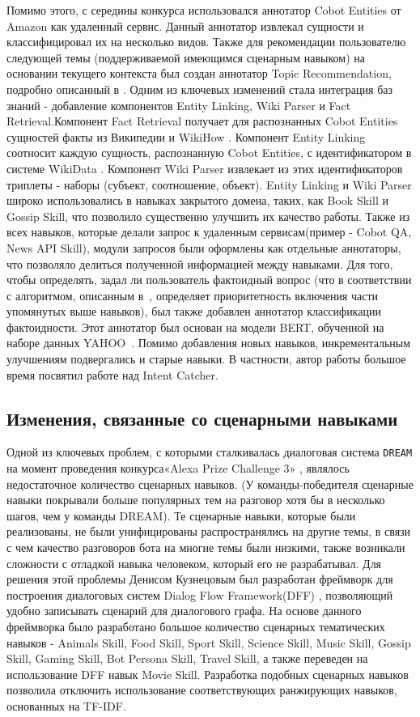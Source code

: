 Помимо этого, с середины конкурса использовался аннотатор Cobot Entities от Amazon как удаленный сервис. Данный аннотатор извлекал сущности и классифицировал их на несколько видов.
Также для рекомендации пользователю следующей темы (поддерживаемой имеющимся сценарным навыком) на основании текущего контекста был создан аннотатор Topic Recommendation, подробно описанный в \cite{dream2}.
Одним из ключевых изменений стала интеграция баз знаний - добавление компонентов Entity Linking, Wiki Parser и Fact Retrieval.Компонент Fact Retrieval получает для распознанных Cobot Entities сущностей факты из Википедии и WikiHow \cite{wikihow}.  Компонент Entity Linking соотносит каждую сущность, распознанную Cobot Entities, с идентификатором в системе WikiData \cite{vrandei_2014}. Компонент Wiki Parser извлекает из этих идентификаторов триплеты - наборы (субъект, соотношение, объект). Entity Linking и Wiki Parser широко использовались в навыках закрытого домена, таких, как Book Skill и Gossip Skill, что позволило существенно улучшить их качество работы.
Также из всех навыков, которые делали запрос к удаленным сервисам(пример -  Cobot QA, News API Skill), модули запросов были оформлены как отдельные аннотаторы, что позволяло делиться полученной информацией между навыками.
Для того, чтобы определять, задал ли пользователь фактоидный вопрос (что в соответствии с алгоритмом, описанным в~\cite{dream2}, определяет приоритетность включения части упомянутых выше навыков), был также добавлен аннотатор классификации фактоидности. Этот аннотатор был основан на модели BERT, обученной на наборе данных YAHOO~\cite{yahoo_dataset}.
Помимо добавления новых навыков, инкрементальным улучшениям подвергались и старые навыки. В частности, автор работы большое время посвятил работе над Intent Catcher. 

\subsection{Изменения, связанные со сценарными навыками}
Одной из ключевых проблем, с которыми сталкивалась диалоговая система \texttt{DREAM} на момент проведения конкурса«Alexa Prize Challenge 3» , являлось недостаточное количество сценарных навыков. (У команды-победителя сценарные навыки покрывали больше популярных тем на разговор хотя бы в несколько шагов, чем у команды DREAM). Те сценарные навыки, которые были реализованы, не были унифицированы распространялись на другие темы, в связи с чем качество разговоров бота на многие темы были низкими, также возникали сложности с отладкой навыка человеком, который его не разрабатывал. Для решения этой проблемы Денисом Кузнецовым был разработан фреймворк для построения диалоговых систем Dialog Flow Framework(DFF) \cite{dff}, позволяющий удобно записывать сценарий для диалогового графа. На основе данного фреймворка было разработано большое количество сценарных тематических навыков - Animals Skill, Food Skill, Sport Skill, Science Skill, Music Skill, Gossip Skill, Gaming Skill, Bot Persona Skill, Travel Skill, а также переведен на использование DFF навык Movie Skill. Разработка подобных сценарных навыков позволила отключить использование соответствующих ранжирующих навыков, основанных на TF-IDF.

